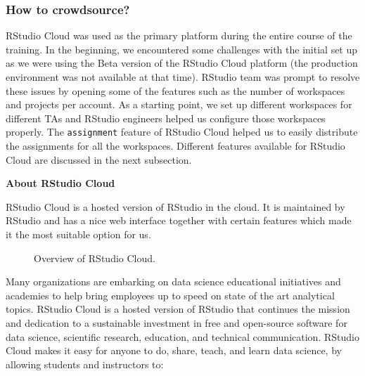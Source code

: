 \hypertarget{how-to-crowdsource}{%
\subsubsection{How to crowdsource?}\label{how-to-crowdsource}}

RStudio Cloud was used as the primary platform during the entire course
of the training. In the beginning, we encountered some challenges with
the initial set up as we were using the Beta version of the RStudio
Cloud platform (the production environment was not available at that
time). RStudio team was prompt to resolve these issues by opening some
of the features such as the number of workspaces and projects per
account. As a starting point, we set up different workspaces for
different TAs and RStudio engineers helped us configure those workspaces
properly. The \texttt{assignment} feature of RStudio Cloud helped us to
easily distribute the assignments for all the workspaces. Different
features available for RStudio Cloud are discussed in the next
subsection.

\vspace{0.35cm}

\noindent \textbf{About RStudio Cloud}

RStudio Cloud is a hosted version of RStudio in the cloud. It is
maintained by RStudio and has a nice web interface together with certain
features which made it the most suitable option for us.

\begin{figure}[htbp]
  \centering
  \caption{Overview of RStudio Cloud.}
  \label{figure:rscloud}
\end{figure}

Many organizations are embarking on data science educational initiatives
and academies to help bring employees up to speed on state of the art
analytical topics. RStudio Cloud is a hosted version of RStudio that
continues the mission and dedication to a sustainable investment in free
and open-source software for data science, scientific research,
education, and technical communication. RStudio Cloud makes it easy for
anyone to do, share, teach, and learn data science, by allowing students
and instructors to:

